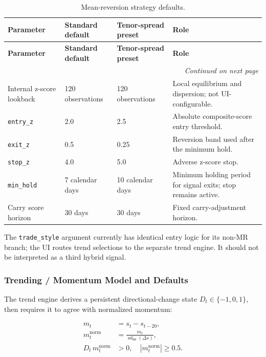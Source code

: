 {\small
\setlength{\LTleft}{0pt}
\setlength{\LTright}{0pt}
\setlength{\tabcolsep}{5pt}
\renewcommand{\arraystretch}{1.15}
\begin{longtable}{p{} p{} p{} p{}}
\caption{Mean-reversion strategy defaults.}\label{tab:pairs-mr-defaults-overleaf} \\
\toprule
\textbf{Parameter} & \textbf{Standard default} & \textbf{Tenor-spread preset} & \textbf{Role} \\
\midrule
\endfirsthead
\toprule
\textbf{Parameter} & \textbf{Standard default} & \textbf{Tenor-spread preset} & \textbf{Role} \\
\midrule
\endhead
\midrule
\multicolumn{4}{r}{\textit{Continued on next page}} \\
\midrule
\endfoot
\bottomrule
\endlastfoot
Internal z-score lookback & 120 observations & 120 observations & Local equilibrium and dispersion; not UI-configurable. \\
\texttt{entry\_z} & 2.0 & 2.5 & Absolute composite-score entry threshold. \\
\texttt{exit\_z} & 0.5 & 0.25 & Reversion band used after the minimum hold. \\
\texttt{stop\_z} & 4.0 & 5.0 & Adverse z-score stop. \\
\texttt{min\_hold} & 7 calendar days & 10 calendar days & Minimum holding period for signal exits; stop remains active. \\
Carry score horizon & 30 days & 30 days & Fixed carry-adjustment horizon. \\
\end{longtable}
}

The \texttt{trade\_style} argument currently has identical entry logic for its non-MR
branch; the UI routes trend selections to the separate trend engine. It should not
be interpreted as a third hybrid signal.

\subsubsection{Trending / Momentum Model and Defaults}

The trend engine derives a persistent directional-change state
$D_t \in \{-1,0,1\}$, then requires it to agree with normalized momentum:

\begin{equation}
\begin{aligned}
m_t &= s_t - s_{t-20}, \\
m_t^{\mathrm{norm}} &= \frac{m_t}{\operatorname{sd}_{60}(\Delta s)}, \\
D_t\,m_t^{\mathrm{norm}} &> 0, \quad \left|m_t^{\mathrm{norm}}\right| \ge 0.5.
\end{aligned}
\end{equation}

